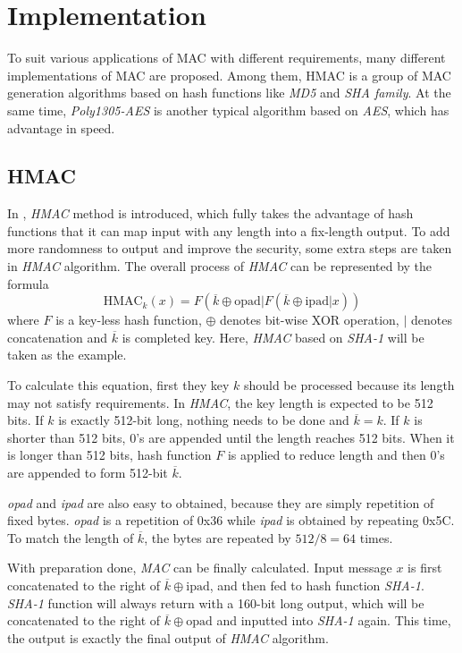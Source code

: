 \section{Implementation}
To suit various applications of MAC with different requirements, many different implementations 
of MAC are proposed. 
Among them, HMAC is a group of MAC generation algorithms based on hash functions 
like \emph{MD5} and \emph{SHA family}.
At the same time, \emph{Poly1305-AES} is another typical algorithm based on \emph{AES}, 
which has advantage in speed. 
\subsection{HMAC}
In \cite{HMAC}, \emph{HMAC} method is introduced, which fully takes the advantage of 
hash functions that it can map input with any length into a fix-length output. 
To add more randomness to output and improve the security, some extra steps are taken 
in \emph{HMAC} algorithm. 
The overall process of \emph{HMAC} can be represented by the formula
$$
\text{HMAC}_k(x)=F(\overline{k}\oplus\text{opad}|F(\overline{k}\oplus\text{ipad}|x))
$$
where $F$ is a key-less hash function, $\oplus$ denotes bit-wise XOR operation, 
$|$ denotes concatenation and $\overline{k}$ is completed key. 
Here, \emph{HMAC} based on \emph{SHA-1} will be taken as the example. 

To calculate this equation, first they key $k$ should be processed because its 
length may not satisfy requirements. In \emph{HMAC}, the key length is expected 
to be 512 bits. If $k$ is exactly 512-bit long, nothing needs to be done and 
$\overline{k}=k$. 
If $k$ is shorter than 512 bits, 0's are appended until the length reaches 512 bits. 
When it is longer than 512 bits, hash function $F$ is applied to reduce length and 
then 0's are appended to form 512-bit $\overline{k}$. 

\emph{opad} and \emph{ipad} are also easy to obtained, because they are 
simply repetition of fixed bytes. 
\emph{opad} is a repetition of 0x36 while \emph{ipad} is obtained by repeating 
0x5C. To match the length of $\overline{k}$, the bytes are repeated by $512/8=64$ times.

With preparation done, \emph{MAC} can be finally calculated. 
Input message $x$ is first concatenated to the right of $\overline{k}\oplus\text{ipad}$, 
and then fed to hash function \emph{SHA-1}. 
\emph{SHA-1} function will always return with a 160-bit long output, which will be  
concatenated to the right of $\overline{k}\oplus\text{opad}$ and inputted into 
\emph{SHA-1} again. 
This time, the output is exactly the final output of \emph{HMAC} algorithm. 
